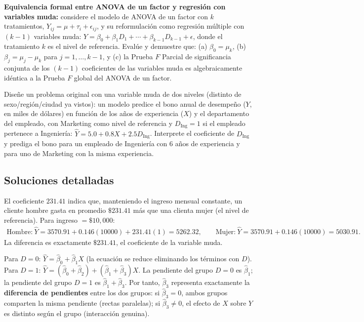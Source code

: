 \begin{problema}
	\label{prob:a61b69d}
	\textbf{Equivalencia formal entre ANOVA de un factor y regresión con variables muda:} considere el modelo de ANOVA de un factor con $k$ tratamientos, $Y_{ij}=\mu+\tau_i+\epsilon_{ij}$, y su reformulación como regresión múltiple con $(k-1)$ variables muda: $Y=\beta_0+\beta_1D_1+\cdots+\beta_{k-1}D_{k-1}+\epsilon$, donde el tratamiento $k$ es el nivel de referencia. Evalúe y demuestre que: (a) $\beta_0=\mu_k$, (b) $\beta_j=\mu_j-\mu_k$ para $j=1,\ldots,k-1$, y (c) la Prueba $F$ Parcial de significancia conjunta de los $(k-1)$ coeficientes de las variables muda es algebraicamente idéntica a la Prueba $F$ global del ANOVA de un factor.
\end{problema}

\begin{problema}
	\label{prob:a9bca82}
	Diseñe un problema original con una variable muda de dos niveles (distinto de sexo/región/ciudad ya vistos): un modelo predice el bono anual de desempeño ($Y$, en miles de dólares) en función de los años de experiencia ($X$) y el departamento del empleado, con Marketing como nivel de referencia y $D_{\text{Ing}}=1$ si el empleado pertenece a Ingeniería: $\hat Y = 5.0+0.8X+2.5D_{\text{Ing}}$. Interprete el coeficiente de $D_{\text{Ing}}$ y prediga el bono para un empleado de Ingeniería con $6$ años de experiencia y para uno de Marketing con la misma experiencia.
\end{problema}

\subsection*{Soluciones detalladas}

\begin{solproblema}[prob:9556f7f]
	El coeficiente $231.41$ indica que, manteniendo el ingreso mensual constante, un cliente hombre gasta en promedio $\$231.41$ más que una clienta mujer (el nivel de referencia). Para ingreso $=\$10{,}000$:
	\begin{align}
		\text{Hombre:}\ \hat Y = 3570.91+0.146(10000)+231.41(1) = 5262.32, \qquad \text{Mujer:}\ \hat Y = 3570.91+0.146(10000) = 5030.91.
	\end{align}
	La diferencia es exactamente $\$231.41$, el coeficiente de la variable muda.
\end{solproblema}

\begin{solproblema}[prob:f520b9b]
	Para $D=0$: $\hat Y=\hat\beta_0+\hat\beta_1X$ (la ecuación se reduce eliminando los términos con $D$). Para $D=1$: $\hat Y=(\hat\beta_0+\hat\beta_2)+(\hat\beta_1+\hat\beta_3)X$. La pendiente del grupo $D=0$ es $\hat\beta_1$; la pendiente del grupo $D=1$ es $\hat\beta_1+\hat\beta_3$. Por tanto, $\hat\beta_3$ representa exactamente la \textbf{diferencia de pendientes} entre los dos grupos: si $\hat\beta_3=0$, ambos grupos comparten la misma pendiente (rectas paralelas); si $\hat\beta_3\neq0$, el efecto de $X$ sobre $Y$ es distinto según el grupo (interacción genuina).
\end{solproblema}

